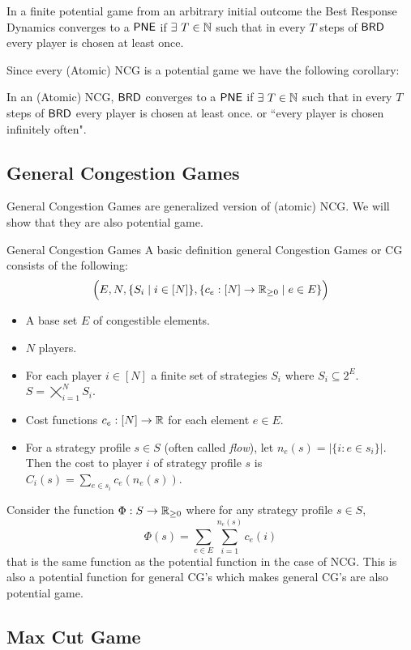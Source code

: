 \begin{Theorem}{}{}
	In a finite potential game from an arbitrary initial outcome the Best Response Dynamics converges to a $\operatorname{\mathsf{PNE}}$ if $\exists\ T\in\mathbb{N}$ such that in every $T$ steps of $\operatorname{\mathsf{BRD}}$ every player is chosen at least once.
\end{Theorem}

Since every (Atomic) NCG is a potential game we have the following corollary:
\begin{corolary}{}{}
	In an (Atomic) NCG, $\operatorname{\mathsf{BRD}}$ converges to a $\operatorname{\mathsf{PNE}}$ if $\exists\ T\in\mathbb{N}$ such that in every $T$ steps of $\operatorname{\mathsf{BRD}}$ every player is chosen at least once. or ``every player is chosen infinitely often".
\end{corolary}


\subsection{General Congestion Games}
General Congestion Games are generalized version of (atomic) NCG. We will show that they are also potential game.
\begin{definition}{General Congestion Games}{}
	A basic definition general Congestion Games or CG consists of the following: $$\Big(E,N, \{S_i\mid i\in[N]\}, \{c_e:[N]\to \mathbb{R}_{\geq 0}\mid e\in E\}\Big)$$
	\begin{itemize}[itemsep=-1mm]
		\item A base set $E$ of congestible elements.
		\item $N$ players.
		\item For each player $i\in[N]$ a finite set of strategies $S_i$ where $S_i\subseteq 2^E$. $S=\bigtimes\limits_{i=1}^N S_i$.
		\item Cost functions $c_e:[N]\to \mathbb{R}$ for each element $e\in E$.
		\item For a strategy profile $s\in S$ (often called \textit{flow}), let $n_e(s)=|\{i\colon e\in s_i\}|$. Then the cost to player $i$ of strategy profile $s$ is $C_i(s)=\sum\limits_{e\in s_i}c_e(n_e(s))$. 
	\end{itemize}
\end{definition}

 Consider the  function $\Phi:S\to \mathbb{R}_{\geq 0}$ where for any strategy profile $s\in S$, $$\Phi(s)=\sum\limits_{e\in E}\sum\limits_{i=1}^{n_e(s)}c_e(i)$$ that is the same function as the potential function in the case of NCG. This is also a potential function for general CG's which makes general CG's are also potential game.
\subsection{Max Cut Game}

